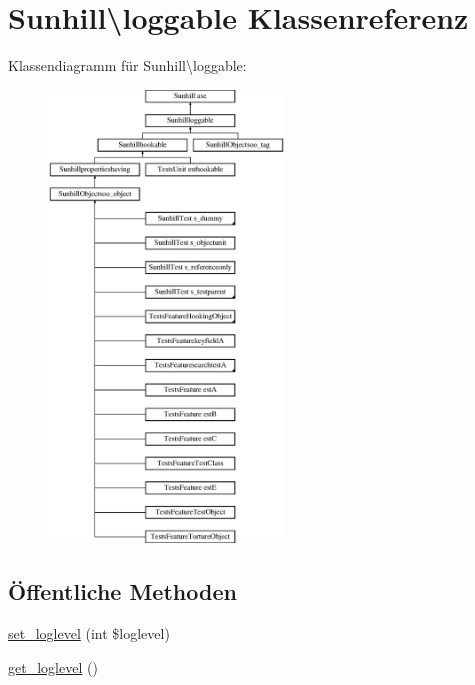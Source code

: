 \hypertarget{classSunhill_1_1loggable}{}\section{Sunhill\textbackslash{}loggable Klassenreferenz}
\label{classSunhill_1_1loggable}
Klassendiagramm für Sunhill\textbackslash{}loggable\+:\begin{figure}[H]
\begin{center}
\leavevmode
\includegraphics[height=12.000000cm]{d3/d86/classSunhill_1_1loggable}
\end{center}
\end{figure}
\subsection*{Öffentliche Methoden}
\begin{DoxyCompactItemize}
\item 
\hyperlink{classSunhill_1_1loggable_ab0b6023936fae376edba6cea489e6669}{set\+\_\+loglevel} (int \$loglevel)
\item 
\hyperlink{classSunhill_1_1loggable_a631376602052e8c850f4c180afc3174c}{get\+\_\+loglevel} ()
\end{DoxyCompactItemize}
